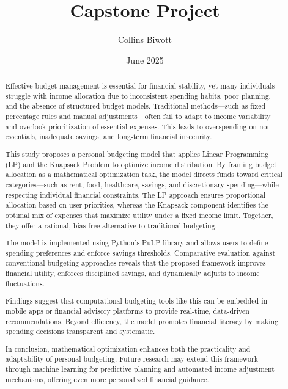 \documentclass{article}
\title{Capstone Project}
\author{Collins Biwott}
\date{June 2025}
\begin{document}
\maketitle
\begin{abstract}
    Effective budget management is essential for financial stability, yet many individuals struggle with income allocation due to inconsistent spending habits, poor planning, and the absence of structured budget models. Traditional methods—such as fixed percentage rules and manual adjustments—often fail to adapt to income variability and overlook prioritization of essential expenses. This leads to overspending on non-essentials, inadequate savings, and long-term financial insecurity.

    This study proposes a personal budgeting model that applies Linear Programming (LP) and the Knapsack Problem to optimize income distribution. By framing budget allocation as a mathematical optimization task, the model directs funds toward critical categories—such as rent, food, healthcare, savings, and discretionary spending—while respecting individual financial constraints. The LP approach ensures proportional allocation based on user priorities, whereas the Knapsack component identifies the optimal mix of expenses that maximize utility under a fixed income limit. Together, they offer a rational, bias-free alternative to traditional budgeting.

    The model is implemented using Python’s PuLP library and allows users to define spending preferences and enforce savings thresholds. Comparative evaluation against conventional budgeting approaches reveals that the proposed framework improves financial utility, enforces disciplined savings, and dynamically adjusts to income fluctuations.

    Findings suggest that computational budgeting tools like this can be embedded in mobile apps or financial advisory platforms to provide real-time, data-driven recommendations. Beyond efficiency, the model promotes financial literacy by making spending decisions transparent and systematic.

    In conclusion, mathematical optimization enhances both the practicality and adaptability of personal budgeting. Future research may extend this framework through machine learning for predictive planning and automated income adjustment mechanisms, offering even more personalized financial guidance.
\end{abstract}
\end{document}
